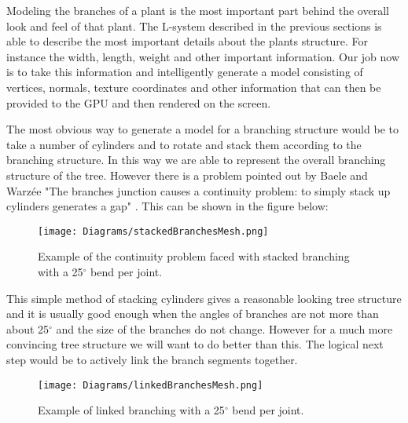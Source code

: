\begin{flushleft}

Modeling the branches of a plant is the most important part behind the overall look and feel of that plant. The L-system described in the previous sections is able to describe the most important details about the plants structure. For instance the width, length, weight and other important information. Our job now is to take this information and intelligently generate a model consisting of vertices, normals, texture coordinates and other information that can then be provided to the GPU and then rendered on the screen.\\

\vspace{5mm}

The most obvious way to generate a model for a branching structure would be to take a number of cylinders and to rotate and stack them according to the branching structure. In this way we are able to represent the overall branching structure of the tree. However there is a problem pointed out by Baele and Warz\'{e}e "The branches junction causes a continuity problem: to simply stack up cylinders generates a gap" \cite{baele2005real}. This can be shown in the figure below:

\FloatBarrier

\begin{figure}[htbp]
	{\centering
		\vspace{7px}
		\texttt{[image: Diagrams/stackedBranchesMesh.png]}
		\caption{Example of the continuity problem faced with stacked branching with a 25$^{\circ}$ bend per joint.}
	}
\end{figure}

\FloatBarrier

\vspace{5mm}


\vspace{5mm}

This simple method of stacking cylinders gives a reasonable looking tree structure and it is usually good enough when the angles of branches are not more than about 25$^{\circ}$ and the size of the branches do not change. However for a much more convincing tree structure we will want to do better than this. The logical next step would be to actively link the branch segments together.

\FloatBarrier

\begin{figure}[htbp]
	{\centering
		\vspace{7px}
		\texttt{[image: Diagrams/linkedBranchesMesh.png]}
		\caption{Example of linked branching with a 25$^{\circ}$ bend per joint.}
	}
\end{figure}

\FloatBarrier

\end{flushleft}


